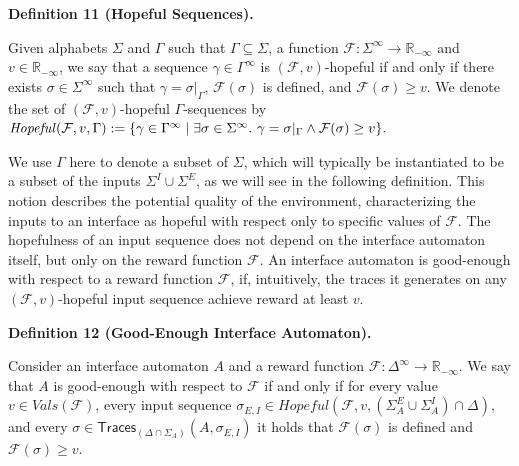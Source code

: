 \documentclass[10pt,a4paper]{article}
\begin{document}
 
 
\par\medskip\noindent\textbf{Definition 11 (Hopeful Sequences).}\par
 
 
Given alphabets $\Sigma$ and $\Gamma$ such that $\Gamma\subseteq\Sigma$, a function $\mathcal{F}:\Sigma^{\infty}\to\mathbb{R}_{-\infty}$ and $v\in\mathbb{R}_{-\infty}$, we say that a sequence $\gamma\in\Gamma^{\infty}$ is $(\mathcal{F},v)$-hopeful if and only if there exists $\sigma\in\Sigma^{\infty}$ such that $\gamma=\sigma|_{\Gamma}$, $\mathcal{F}(\sigma)$ is defined, and $\mathcal{F}(\sigma)\geq v$. We denote the set of $(\mathcal{F},v)$-hopeful $\Gamma$-sequences by $\mathit{Hopeful}(\mathcal{F},v,\Gamma):=\{\gamma\in\Gamma^{\infty}\mid\exists\sigma\in\Sigma^{\infty}.\nobreak\ \gamma=\sigma|_{\Gamma}\land\mathcal{F}(\sigma)\geq v\}.$\par
 
 
 
 
We use $\Gamma$ here to denote a subset of $\Sigma$, which will typically be instantiated to be a subset of the inputs $\Sigma^{I}\cup\Sigma^{E}$, as we will see in the following definition. This notion describes the potential quality of the environment, characterizing the inputs to an interface as hopeful with respect only to specific values of $\mathcal{F}$. The hopefulness of an input sequence does not depend on the interface automaton itself, but only on the reward function $\mathcal{F}$. An interface automaton is good-enough with respect to a reward function $\mathcal{F}$, if, intuitively, the traces it generates on any $(\mathcal{F},v)$-hopeful input sequence achieve reward at least $v$.\par
 
 
 
\par\medskip\noindent\textbf{Definition 12 (Good-Enough Interface Automaton).}\par
 
 
Consider an interface automaton $A$ and a reward function $\mathcal{F}:\Delta^{\infty}\to\mathbb{R}_{-\infty}$. We say that $A$ is good-enough with respect to $\mathcal{F}$ if and only if for every value $v\in\mathit{Vals}(\mathcal{F})$, every input sequence $\sigma_{E,I}\in\mathit{Hopeful}(\mathcal{F},v,(\Sigma_{A}^{E}\cup\Sigma_{A}^{I})\cap\Delta)$, and every $\sigma\in\mathsf{Traces}_{(\Delta\cap\Sigma_{A})}(A,\sigma_{E,I})$ it holds that $\mathcal{F}(\sigma)$ is defined and $\mathcal{F}(\sigma)\geq v$.\par
 
\end{document}
